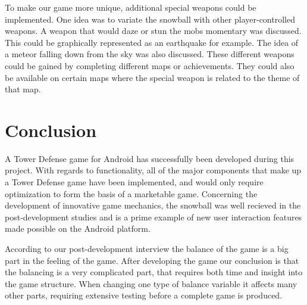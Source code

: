 To make our game more unique, additional special weapons could be implemented. One idea was to variate the snowball with other player-controlled weapons. A weapon that would daze or stun the mobs momentary was discussed. This could be graphically represented as an earthquake for example. The idea of a meteor falling down from the sky was also discussed. These different weapons could be gained by completing different maps or achievements. They could also be available on certain maps where the special weapon is related to the theme of that map.
\section{Conclusion}

A Tower Defense game for Android has successfully been developed during this project. With regards to functionality, all of the major components that make up a Tower Defense game have been implemented, and would only require optimization to form the basis of a marketable game. Concerning the development of innovative game mechanics, the snowball was well recieved in the post-development studies and is a prime example of new user interaction features made possible on the Android platform. 

According to our post-development interview the balance of the game is a big part in the feeling of the game. After developing the game our conclusion is that the balancing is a very complicated part, that requires both time and insight into the game structure. When changing one type of balance variable it affects many other parts, requiring extensive testing before a complete game is produced.